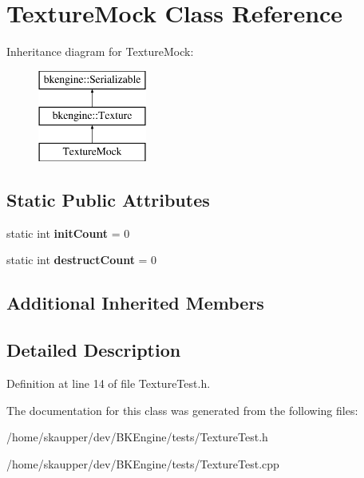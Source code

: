 \hypertarget{classTextureMock}{}\section{Texture\+Mock Class Reference}
\label{classTextureMock}
Inheritance diagram for Texture\+Mock\+:\begin{figure}[H]
\begin{center}
\leavevmode
\includegraphics[height=3.000000cm]{classTextureMock}
\end{center}
\end{figure}
\subsection*{Static Public Attributes}
\begin{DoxyCompactItemize}
\item 
\mbox{\label{classTextureMock_a7270b7f066e9f909afe0cf1f9e246fa5}} 
static int {\bfseries init\+Count} = 0
\item 
\mbox{\label{classTextureMock_a3507d8bf53323a7314b4cdc039b6fc31}} 
static int {\bfseries destruct\+Count} = 0
\end{DoxyCompactItemize}
\subsection*{Additional Inherited Members}


\subsection{Detailed Description}


Definition at line 14 of file Texture\+Test.\+h.



The documentation for this class was generated from the following files\+:\begin{DoxyCompactItemize}
\item 
/home/skaupper/dev/\+B\+K\+Engine/tests/Texture\+Test.\+h\item 
/home/skaupper/dev/\+B\+K\+Engine/tests/Texture\+Test.\+cpp\end{DoxyCompactItemize}
